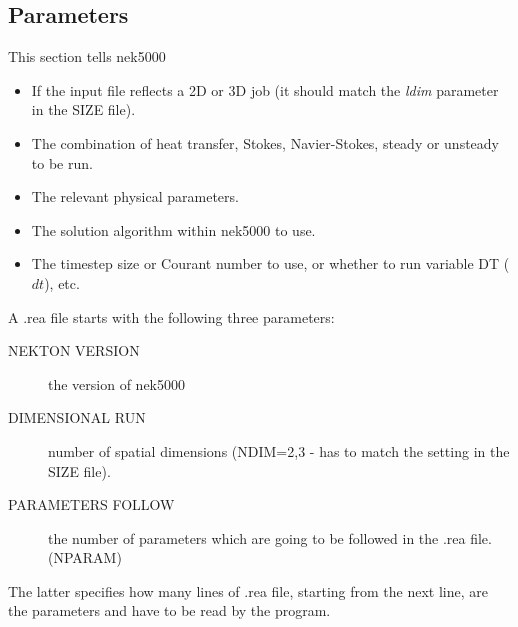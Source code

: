 \subsection{Parameters}
This section tells nek5000
\begin{itemize}
\item If the input file reflects a 2D or 3D job (it should match the \textit{ldim} parameter in the SIZE file).
\item The combination of heat transfer, Stokes, Navier-Stokes, steady or unsteady to be run.
\item The relevant physical parameters.
\item The solution algorithm within nek5000 to use.
\item The timestep size or Courant number to use, or whether to run variable DT ($dt$), etc.
\end{itemize}
A .rea file starts with the following three parameters:
\begin{description}
\item [NEKTON VERSION] the version of nek5000
\item [DIMENSIONAL RUN] number of spatial dimensions (NDIM=2,3 - has to match the setting in the SIZE file).
\item [PARAMETERS FOLLOW] the number of parameters which are going to be followed in the .rea file.(NPARAM)
\end{description}
The latter specifies how many lines of .rea file, starting from the next line, are the parameters and have to be read by the program.\\  

